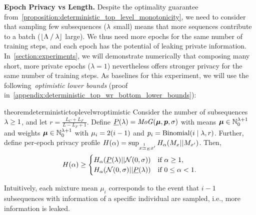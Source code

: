 \textbf{Epoch Privacy vs Length.}
Despite the optimality guarantee from~\cref{proposition:deterministic_top_level_monotonicity}, we need to consider that sampling few subsequences ($\lambda$ small)
means that more sequences contribute to a batch ($\lfloor \Lambda \mathbin{/} \lambda \rfloor$ large).
We thus need more epochs for the same number of training steps, and each epoch has the potential of leaking private information.
In~\cref{section:experiments}, we will demonstrate numerically that composing many short, more private epochs ($\lambda=1$) nevertheless offers stronger privacy for the same number of training steps.
As baselines for this experiment, we will use the following~\emph{optimistic lower bounds}   (proof in~\cref{appendix:deterministic_top_wr_bottom_lower_bounds}):
\begin{restatable}{theorem}{deterministictoplevelwroptimistic}\label{theorem:deterministic_top_level_wr_optimistic}
    Consider the number of subsequences $\lambda \geq 1$,
    and let $r = \frac{L_C + L_F}{L - L_F + 1}$.
    Define
    $\underline{P}(\lambda) = \mathit{MoG}({\bm{\mu}}, {\bm{p}}, \sigma)$ with
    means ${\bm{\mu}} \in {\mathbb{N}}_0^{\lambda +1}$ and weights ${\bm{\mu}} \in {\mathbb{N}}_0^{\lambda +1}$
    with ${\mu}_i = 2 (i-1)$
    and ${p}_i = \mathrm{Binomial}(i \mid \lambda, r)$. Further, define per-epoch privacy profile $H(\alpha) = \sup_{x \overset{1}{\simeq}_{E} x'} H_\alpha(M_x || M_{x'})$. Then, 
    \begin{equation*}
        H(\alpha) \geq 
        \begin{cases}
            H_\alpha(\underline{P}(\lambda) || \mathcal{N}(0,\sigma)) & \text{if } \alpha \geq 1,\\
            H_\alpha(\mathcal{N}(0,\sigma) || \underline{P}(\lambda)) & \text{if } 0 \leq \alpha < 1.
        \end{cases}
    \end{equation*}
\end{restatable}
Intuitively, each mixture mean $\mu_i$ corresponds to the event that $i-1$ subsequences with information of a specific individual are sampled, i.e., more information is leaked.

